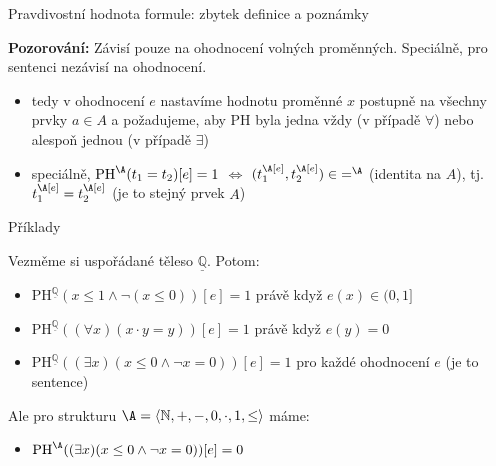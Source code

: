 \documentclass{beamer}
\begin{document}
\begin{frame}{Pravdivostní hodnota formule: zbytek definice a poznámky}
    
    \pause

    \pause
    \textbf{Pozorování:} Závisí pouze na ohodnocení volných proměnných. Speciálně, pro sentenci nezávisí na ohodnocení.

    \pause
    \begin{itemize}
        \item tedy v ohodnocení $e$ nastavíme hodnotu proměnné $x$ postupně na všechny prvky $a\in A$ a požadujeme, aby PH byla jedna vždy (v případě $\forall$) nebo alespoň jednou (v případě $\exists$)\pause
        \item speciálně, $\mathrm{PH}^\A(t_1=t_2)[e]=1$ $\Leftrightarrow$ $(t_1^\A[e],t_2^\A[e])\in {=^\A}$ (\alert{identita} na $A$), tj. $t_1^\A[e]=t_2^\A[e]$ (je to stejný prvek $A$)
    \end{itemize}
    
\end{frame}


\begin{frame}{Příklady}
    
    Vezměme si uspořádané těleso $\underline{\mathbb Q}$. Potom:\pause
    \begin{itemize}
        \item $\mathrm{PH}^{\underline{\mathbb Q}}(x\leq 1 \land \neg (x\leq 0))[e]=1$ právě když $e(x)\in (0,1]$\pause
        \item $\mathrm{PH}^{\underline{\mathbb Q}}((\forall x)(x\cdot y = y))[e]=1$ právě když $e(y)=0$\pause
        \item $\mathrm{PH}^{\underline{\mathbb Q}}((\exists x)(x \leq 0 \land \neg x=0))[e]=1$ pro každé ohodnocení $e$ (je to sentence)\pause
    \end{itemize}   
    Ale pro strukturu $\A=\langle \mathbb N,+,-,0,\cdot,1,\leq\rangle$ máme:\pause 
    \begin{itemize}
        \item $\mathrm{PH}^{\A}((\exists x)(x \leq 0 \land \neg x=0))[e]=0$ 
    \end{itemize}     

\end{frame}
\end{document}
